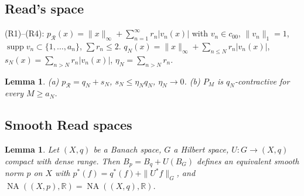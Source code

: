 \documentclass[10pt]{amsart}
\newtheorem{lemma}[theorem]{Lemma}
\theoremstyle{remark}
\newcommand{\R}{\mathbb{R}}
\newcommand{\Read}{\mathcal{R}}
\newcommand{\NA}{\operatorname{NA}}
\newcommand{\supp}{\operatorname{supp}}
\begin{document}
\subsection{Read's space}
(R1)--(R4): $p_{\Read}(x)=\|x\|_\infty+\sum_{n=1}^{\infty}r_n|v_n(x)|$ with $v_n\in c_{00}$, $\|v_n\|_1=1$, $\supp v_n\subset\{1,\ldots,a_n\}$, $\sum r_n\le 2$.
$q_N(x)=\|x\|_\infty+\sum_{n\le N}r_n|v_n(x)|$, $s_N(x)=\sum_{n>N}r_n|v_n(x)|$, $\eta_N=\sum_{n>N}r_n$.
\begin{lemma}\label{lem:trunc}
(a) $p_\Read=q_N+s_N$, $s_N\le\eta_Nq_N$, $\eta_N\to0$. (b) $P_M$ is $q_N$-contractive for every $M\ge a_N$.
\end{lemma}

\subsection{Smooth Read spaces}
\begin{lemma}\label{lem:smoothing}
Let $(X,q)$ be a Banach space, $G$ a Hilbert space, $U:G\to(X,q)$ compact with dense range. Then
$B_p=B_q+U(B_G)$ defines an equivalent smooth norm $p$ on $X$ with
$p^*(f)=q^*(f)+\|U^*f\|_G$, and $\NA((X,p),\R)=\NA((X,q),\R)$.
\end{lemma}
\end{document}

